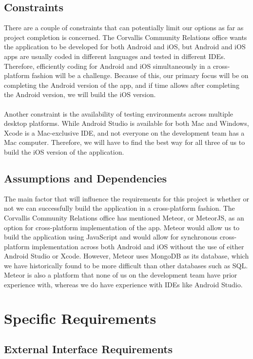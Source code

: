 \documentclass[draftclsnofoot, onecolumn, 10pt, compsoc]{IEEEtran}
\begin{document}
		\subsection{Constraints}
			There are a couple of constraints that can potentially limit our options as far as project completion is concerned. The Corvallis Community Relations office wants the application to be developed for both Android and iOS, but Android and iOS apps are usually coded in different languages and tested in different IDEs. Therefore, efficiently coding for Android and iOS simultaneously in a cross-platform fashion will be a challenge. Because of this, our primary focus will be on completing the Android version of the app, and if time allows after completing the Android version, we will build the iOS version. \\ \\
			Another constraint is the availability of testing environments across multiple desktop platforms. While Android Studio is available for both Mac and Windows, Xcode is a Mac-exclusive IDE, and not everyone on the development team has a Mac computer. Therefore, we will have to find the best way for all three of us to build the iOS version of the application.
		
		\subsection{Assumptions and Dependencies}
			The main factor that will influence the requirements for this project is whether or not we can successfully build the application in a cross-platform fashion. The Corvallis Community Relations office has mentioned Meteor, or MeteorJS, as an option for cross-platform implementation of the app. Meteor would allow us to build the application using JavaScript and would allow for synchronous cross-platform implementation across both Android and iOS without the use of either Android Studio or Xcode. However, Meteor uses MongoDB as its database, which we have historically found to be more difficult than other databases such as SQL. Meteor is also a platform that none of us on the development team have prior experience with, whereas we do have experience with IDEs like Android Studio.
		
	\section{Specific Requirements}
		\subsection{External Interface Requirements}
\end{document}

